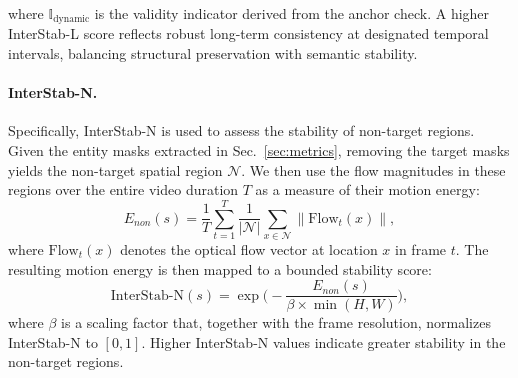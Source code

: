 where $\mathbb{I}_{\text{dynamic}}$ is the validity indicator derived from the anchor check. 
A higher InterStab-L score reflects robust long-term consistency at designated temporal intervals, balancing structural preservation with semantic stability.

\paragraph{InterStab-N.} 

Specifically, InterStab-N is used to assess the stability of non-target regions. 
Given the entity masks extracted in Sec.~\ref{sec:metrics}, removing the target masks yields the non-target spatial region $\mathcal{N}$. We then use the flow magnitudes in these regions over the entire video duration $T$ as a measure of their motion energy:
\begin{equation}
E_{non}(s)=\frac{1}{T}\sum_{t=1}^{T}\frac{1}{|\mathcal{N}|}\sum_{x\in \mathcal{N}}\|\mathrm{Flow}_t(x)\|,
\end{equation}
{where $\mathrm{Flow}_t(x)$ denotes the optical flow vector at location $x$ in frame $t$. The resulting motion energy is then mapped to a bounded stability score:}
\begin{equation}
\mathrm{InterStab\text{-}N}(s)=\exp\Big(-\frac{E_{non}(s)}{\beta \times \min(H,W)}\Big), 
\end{equation}
{where $\beta$ is a scaling factor that, together with the frame resolution, normalizes InterStab-N to $[0,1]$. Higher InterStab-N values indicate greater stability in the non-target regions.}

